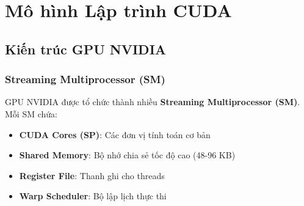 \chapter{Mô hình Lập trình CUDA}
\label{chap:cuda_basics}

\section{Kiến trúc GPU NVIDIA}

\subsection{Streaming Multiprocessor (SM)}

GPU NVIDIA được tổ chức thành nhiều \textbf{Streaming Multiprocessor (SM)}. Mỗi SM chứa:
\begin{itemize}
    \item \textbf{CUDA Cores (SP)}: Các đơn vị tính toán cơ bản
    \item \textbf{Shared Memory}: Bộ nhớ chia sẻ tốc độ cao (48-96 KB)
    \item \textbf{Register File}: Thanh ghi cho threads
    \item \textbf{Warp Scheduler}: Bộ lập lịch thực thi
\end{itemize}

